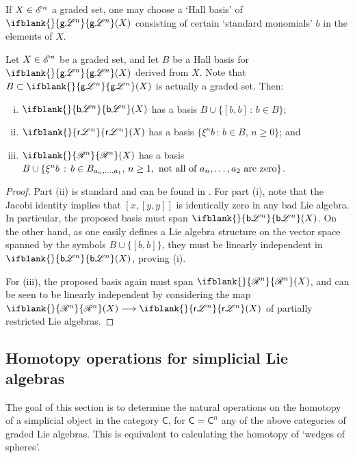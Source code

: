 \documentclass[11pt]{article}
\newcommand{\GS}[1]{\scrE^{#1}}
\newcommand{\RestLie}[1]{\mathsf{r}{\scrL}^{#1}}%
\newcommand{\GoodLie}[1]{\mathsf{g}{\scrL}^{#1}}%
\newcommand{\BadLie}[1]{\mathsf{b}{\scrL}^{#1}}%
\newcommand{\PRLie}[1]{\scrR^{#1}}%
\newcommand{\iteratedrestn}[2]{\xi^{#2}{#1}}
\newcommand{\Fr}[2][]{\ifblank{#1}{#2}{#2_{#1}}}
\begin{document}
\begin{CategoriesOfInterest}
If $X\in\GS{n}$ a graded set, one may choose a `Hall basis' of $\Fr{\GoodLie{n}}(X)$ \cite{MR0038336} consisting of certain `standard monomials' $b$ in the elements of $X$.
\begin{prop*}
Let $X\in\GS{n}$ be a graded set, and let $B$ be a Hall basis for $\Fr{\GoodLie{n}}(X)$ derived from $X$. Note that $B\subset \Fr{\GoodLie{n}}(X)$ is actually a graded set. Then:
\begin{enumerate}[i)]\squishlist
\setlength{\parindent}{.25in}
\item $\Fr{\BadLie{n}}(X)$ has a basis $B\cup\{[b,b]\,:\,b\in B\}$;
\item $\Fr{\RestLie{n}}(X)$ has a basis $\{\iteratedrestn{b}{n}\,:\,b\in B,\,n\geq0\}$; and
\item $\Fr{\PRLie{n}}(X)$ has a basis $B\cup \{\iteratedrestn{b}{n}\,:\,b\in B_{a_{n},\ldots,a_1},\,n\geq1,\textup{ not all of $a_n,\ldots,a_2$ are zero}\}$.
\end{enumerate}
\end{prop*}
\begin{proof}
Part (ii) is standard and can be found in \cite[Proposition 14, p.66]{MR886063}.
For part (i), note that the Jacobi identity implies that $[x,[y,y]]$ is identically zero in any bad Lie algebra.
In particular, the proposed basis must span $\Fr{\BadLie{n}}(X)$. On the other hand, as one easily defines a Lie algebra structure on the vector space spanned by the symbols $B\cup\{[b,b]\}$, they must be linearly independent in $\Fr{\BadLie{n}}(X)$, proving (i).

For (iii), the proposed basis again must span $\Fr{\PRLie{n}}(X)$, and can be seen to be linearly independent by considering the map $\Fr{\PRLie{n}}(X)\to \Fr{\RestLie{n}}(X)$ of partially restricted Lie algebras.
\end{proof}


\subsection{Homotopy operations for simplicial Lie algebras}
The goal of this section is to determine the natural operations on the homotopy of a simplicial object in the category $\mathsf{C}$, for $\mathsf{C}=\mathsf{C}^n$ any of the above categories of graded Lie algebras. This is equivalent to calculating the homotopy of `wedges of spheres'.


\end{CategoriesOfInterest}
\end{document}
